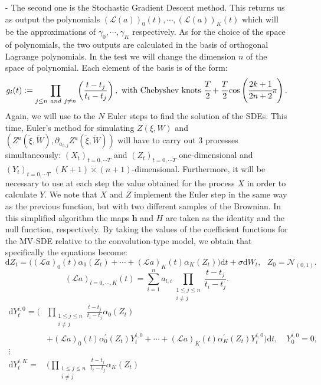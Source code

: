 \documentclass[a4paper,11pt,openright]{report}
\begin{document}
\begin{itemize}
\item[-] The second one is the Stochastic Gradient Descent method. This returns us as output the polynomials $(\mathcal{L}(a))_0(t), \cdots, (\mathcal{L}(a))_K(t)$ which will be the approximations of $\gamma_0, \cdots, \gamma_K$ respectively. As for the choice of the space of polynomials, the two outputs are calculated in the basis of orthogonal Lagrange polynomials. In the test we will change the dimension $n$ of the space of polynomial. Each element of the basis is of the form:
\[
g_i(t):=\prod_{j \leq n \ and  \ j\neq n} \left( \frac{t - t_j}{t_i - t_j} \right), \text{ with Chebyshev knots } \cfrac{T}{2} + \cfrac{T}{2} \cos \left( \cfrac{2k + 1}{2n +2} \pi \right).
\]
Again, we will use to the $N$ Euler steps to find the solution of the SDEs. This time, Euler's method for simulating $Z(\xi , W)$ and $\left( Z^a(\tilde{\xi} , \tilde{W}), \partial_{a_{h,j}} Z^a(\tilde{\xi} , \tilde{W}) \right)$ will have to carry out 3 processes simultaneously: $(X_t)_{t=0, \cdots T}$ and $(Z_t)_{t=0, \cdots T}$ one-dimensional and $(Y_t)_{t=0, \cdots T}$ $(K+1) \times (n+1)$-dimensional. Furthermore, it will be necessary to use at each step the value obtained for the process $X$ in order to calculate $Y$. We note that $X$ and $Z$ implement the Euler step in the same way as the previous function, but with two different samples of the Brownian. In this simplified algorithm the maps $\textbf{h}$ and $H$ are taken as the identity and the null function, respectively. By taking the values of the coefficient functions for the MV-SDE relative to the convolution-type model, we obtain that specifically the equations become:
\[
\mathrm{d} Z_t = \Big( (\mathcal{L}a)_0(t)\alpha_0(Z_t) + \cdots + (\mathcal{L}a)_K(t)\alpha_K(Z_t) \Big) \mathrm{d} t + \sigma \mathrm{d} W_t, \ \ \ Z_0 = \mathcal{N}_{(0,1)}.
\]
\[
(\mathcal{L}a)_{l=0, \cdots , K}(t) = \sum^{n}_{i=1} a_{l,i} \prod_{\substack{ 1\leq j \leq n \\ i\neq j}} \frac{t-t_j}{t_i - t_j}.
\]
\begin{equation*}
\begin{aligned}
\textrm{d}Y^{i,0}_t = \bigl( &\prod_{\substack{ 1\leq j \leq n \\ i\neq j}} \frac{t-t_j}{t_i - t_j} \alpha_0(Z_t) \\
&+ (\mathcal{L}a)_0(t) \alpha^\prime_0(Z_t)  Y^{i,0}_t + \cdots + (\mathcal{L}a)_K(t) \alpha^\prime_K(Z_t)  Y^{i,0}_t\bigr) \textrm{d} t, \quad Y^{i,0}_0 = 0,\\
\vdots \\
\textrm{d}Y^{i,K}_t = &\bigl( \prod_{\substack{ 1\leq j \leq n \\ i\neq j}} \frac{t-t_j}{t_i - t_j} \alpha_K(Z_t) \\

\end{aligned}
\end{equation*}
\end{itemize}
\end{document}
